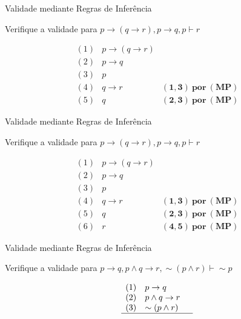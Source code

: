 \begin{frame}[t]{Validade mediante Regras de Inferência}

	Verifique a validade para $p \rightarrow (q \rightarrow r), p \rightarrow q, p \vdash r$
	
	\vskip 1.5cm
	
	$$\begin{array}{lll}
	(1) & p \rightarrow (q \rightarrow r)  & \\
	(2) & p \rightarrow q & \\
	(3) & p & \\
	\hline
	(4) & q \rightarrow r & \mathbf{(1,3)~por~(MP)} \\
	(5) & q & \mathbf{(2,3)~por~(MP)}
	\end{array}$$	
\end{frame}


\begin{frame}[t]{Validade mediante Regras de Inferência}

	Verifique a validade para $p \rightarrow (q \rightarrow r), p \rightarrow q, p \vdash r$
	
	\vskip 1.5cm
	
	$$\begin{array}{lll}
	(1) & p \rightarrow (q \rightarrow r)  & \\
	(2) & p \rightarrow q & \\
	(3) & p & \\
	\hline
	(4) & q \rightarrow r & \mathbf{(1,3)~por~(MP)} \\
	(5) & q & \mathbf{(2,3)~por~(MP)} \\
	(6) & r & \mathbf{(4,5)~por~(MP)}
	\end{array}$$	
\end{frame}


\begin{frame}[t]{Validade mediante Regras de Inferência}

	Verifique a validade para $p \rightarrow q, p \wedge q \rightarrow r, \sim (p \wedge r) \vdash \sim p$
	
	\vskip 1.5cm
	
	$$\begin{array}{lll}
	(1) & p \rightarrow q  & \\
	(2) & p \wedge q \rightarrow r & \\
	(3) & \sim (p \wedge r) & \\
	\hline
	\end{array}$$	
\end{frame}


